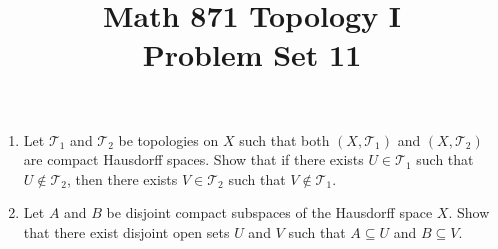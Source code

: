 \documentclass[12pt]{article}
\title{Math 871 Topology I \\ Problem Set 11}
\author{}
\date{}
\newcommand{\T}{\mathcal{T}}
\theoremstyle{definition}
\begin{document}
\maketitle


	
\thispagestyle{fancy}
\pagestyle{fancy}



\begin{enumerate}[roomy]
\item Let $\T_1$ and $\T_2$ be topologies on $X$ such that both $(X, \T_1)$ and $(X, \T_2)$ are compact Hausdorff spaces. Show that if there exists $U \in \T_1$ such that $U \notin \T_2$, then there exists $V \in \T_2$ such that $V \notin \T_1$.


\item Let $A$ and $B$ be disjoint compact subspaces of the Hausdorff space $X$.
Show that there exist disjoint open sets $U$ and $V$ such that $A \subseteq U$ and $B \subseteq V$. 



\end{enumerate}
\end{document}
